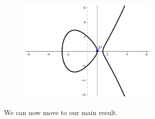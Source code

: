 \documentclass[]{../../math_paper}
\begin{document}
\begin{figure}[H]
    \centering
    \includegraphics[height = 2in]{media/curve_3.png}
    \label{fig:curve3}
\end{figure}

We can now move to our main result.
\end{document}

